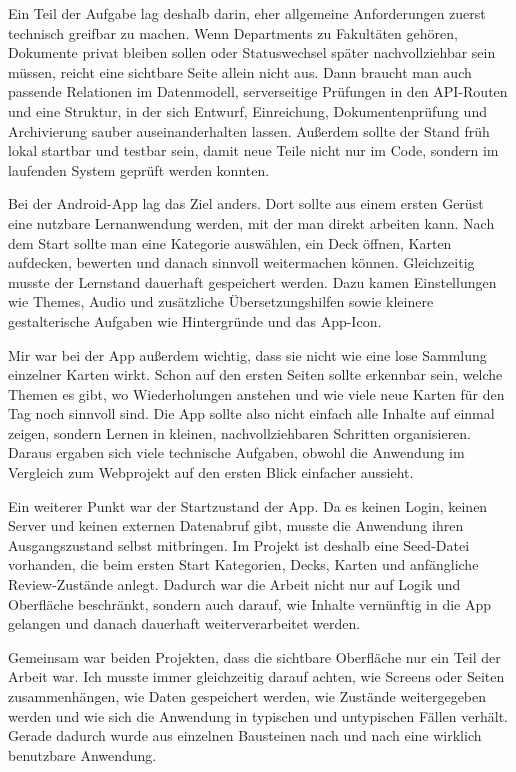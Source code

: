 \documentclass{Vorlage}
\begin{document}
Ein Teil der Aufgabe lag deshalb darin, eher allgemeine Anforderungen zuerst technisch greifbar zu machen. Wenn Departments zu Fakult\"aten geh\"oren, Dokumente privat bleiben sollen oder Statuswechsel sp\"ater nachvollziehbar sein m\"ussen, reicht eine sichtbare Seite allein nicht aus. Dann braucht man auch passende Relationen im Datenmodell, serverseitige Pr\"ufungen in den API-Routen und eine Struktur, in der sich Entwurf, Einreichung, Dokumentenpr\"ufung und Archivierung sauber auseinanderhalten lassen. Au\ss{}erdem sollte der Stand fr\"uh lokal startbar und testbar sein, damit neue Teile nicht nur im Code, sondern im laufenden System gepr\"uft werden konnten.

Bei der Android-App lag das Ziel anders. Dort sollte aus einem ersten Ger\"ust eine nutzbare Lernanwendung werden, mit der man direkt arbeiten kann. Nach dem Start sollte man eine Kategorie ausw\"ahlen, ein Deck \"offnen, Karten aufdecken, bewerten und danach sinnvoll weitermachen k\"onnen. Gleichzeitig musste der Lernstand dauerhaft gespeichert werden. Dazu kamen Einstellungen wie Themes, Audio und zus\"atzliche \"Ubersetzungshilfen sowie kleinere gestalterische Aufgaben wie Hintergr\"unde und das App-Icon.

Mir war bei der App au\ss{}erdem wichtig, dass sie nicht wie eine lose Sammlung einzelner Karten wirkt. Schon auf den ersten Seiten sollte erkennbar sein, welche Themen es gibt, wo Wiederholungen anstehen und wie viele neue Karten f\"ur den Tag noch sinnvoll sind. Die App sollte also nicht einfach alle Inhalte auf einmal zeigen, sondern Lernen in kleinen, nachvollziehbaren Schritten organisieren. Daraus ergaben sich viele technische Aufgaben, obwohl die Anwendung im Vergleich zum Webprojekt auf den ersten Blick einfacher aussieht.

Ein weiterer Punkt war der Startzustand der App. Da es keinen Login, keinen Server und keinen externen Datenabruf gibt, musste die Anwendung ihren Ausgangszustand selbst mitbringen. Im Projekt ist deshalb eine Seed-Datei vorhanden, die beim ersten Start Kategorien, Decks, Karten und anf\"angliche Review-Zust\"ande anlegt. Dadurch war die Arbeit nicht nur auf Logik und Oberfl\"ache beschr\"ankt, sondern auch darauf, wie Inhalte vern\"unftig in die App gelangen und danach dauerhaft weiterverarbeitet werden.

Gemeinsam war beiden Projekten, dass die sichtbare Oberfl\"ache nur ein Teil der Arbeit war. Ich musste immer gleichzeitig darauf achten, wie Screens oder Seiten zusammenh\"angen, wie Daten gespeichert werden, wie Zust\"ande weitergegeben werden und wie sich die Anwendung in typischen und untypischen F\"allen verh\"alt. Gerade dadurch wurde aus einzelnen Bausteinen nach und nach eine wirklich benutzbare Anwendung.
\end{document}
